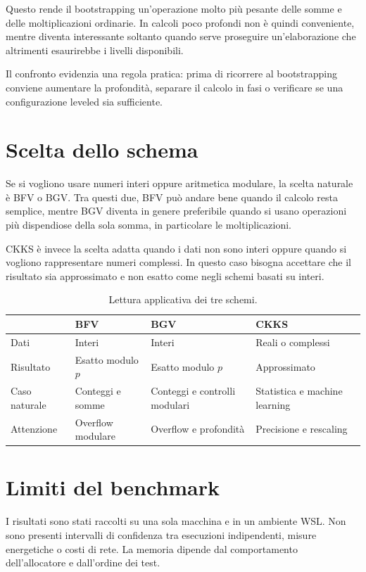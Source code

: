 Questo rende il bootstrapping un'operazione molto pi\`u pesante delle somme e delle moltiplicazioni ordinarie. In calcoli poco profondi non \`e quindi conveniente, mentre diventa interessante soltanto quando serve proseguire un'elaborazione che altrimenti esaurirebbe i livelli disponibili.

Il confronto evidenzia una regola pratica: prima di ricorrere al bootstrapping conviene aumentare la profondit\`a, separare il calcolo in fasi o verificare se una configurazione leveled sia sufficiente.

\section{Scelta dello schema}
Se si vogliono usare numeri interi oppure aritmetica modulare, la scelta naturale \`e BFV o BGV. Tra questi due, BFV pu\`o andare bene quando il calcolo resta semplice, mentre BGV diventa in genere preferibile quando si usano operazioni pi\`u dispendiose della sola somma, in particolare le moltiplicazioni.

CKKS \`e invece la scelta adatta quando i dati non sono interi oppure quando si vogliono rappresentare numeri complessi. In questo caso bisogna accettare che il risultato sia approssimato e non esatto come negli schemi basati su interi.

\begin{table}[H]
\centering
\small
\begin{tabular}{p{2.3cm}p{3.2cm}p{3.2cm}p{3.2cm}}
\toprule
 & \textbf{BFV} & \textbf{BGV} & \textbf{CKKS} \\
\midrule
Dati & Interi & Interi & Reali o complessi \\
Risultato & Esatto modulo $p$ & Esatto modulo $p$ & Approssimato \\
Caso naturale & Conteggi e somme & Conteggi e controlli modulari & Statistica e machine learning \\
Attenzione & Overflow modulare & Overflow e profondit\`a & Precisione e rescaling \\
\bottomrule
\end{tabular}
\caption{Lettura applicativa dei tre schemi.}
\label{tab:scelta_schema}
\end{table}

\section{Limiti del benchmark}
I risultati sono stati raccolti su una sola macchina e in un ambiente WSL. Non sono presenti intervalli di confidenza tra esecuzioni indipendenti, misure energetiche o costi di rete. La memoria dipende dal comportamento dell'allocatore e dall'ordine dei test.

